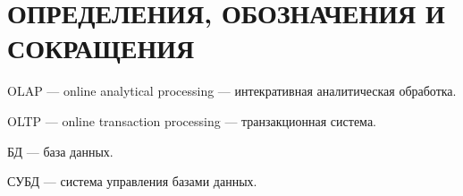 \section*{\large ОПРЕДЕЛЕНИЯ, ОБОЗНАЧЕНИЯ И СОКРАЩЕНИЯ}

OLAP --- online analytical processing --- интекративная аналитическая обработка.

OLTP --- online transaction processing --- транзакционная система.

БД --- база данных.

СУБД --- система управления базами данных.

\pagebreak